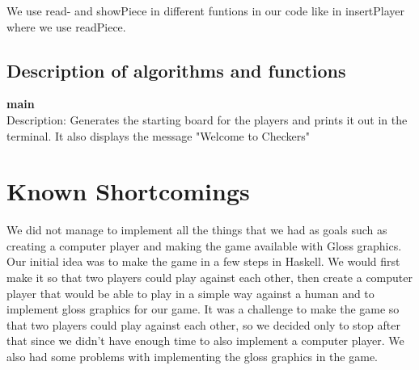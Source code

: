 \documentclass[12pt,a4paper]{article}
\begin{document}
We use read- and showPiece in different funtions in our code like in insertPlayer where we use readPiece.

\subsection{Description of algorithms and functions}
\textbf{\large {main}}
\\
Description: Generates the starting board for the players and prints it out in the terminal.
It also displays the message "Welcome to Checkers"
\\

\section{Known Shortcomings}
We did not manage to implement all the things that we had as goals such as creating a computer player and making the game available with Gloss graphics.
Our initial idea was to make the game in a few steps in Haskell. We would first make it so that two players could play against each other, then create a computer player that would be able to play in a simple way against a human and to implement gloss graphics for our game. It was a challenge to make the game so that two players could play against each other, so we decided only to stop after that since we didn’t have enough time to also implement a computer player. We also had some problems with implementing the gloss graphics in the game.
\end{document}
